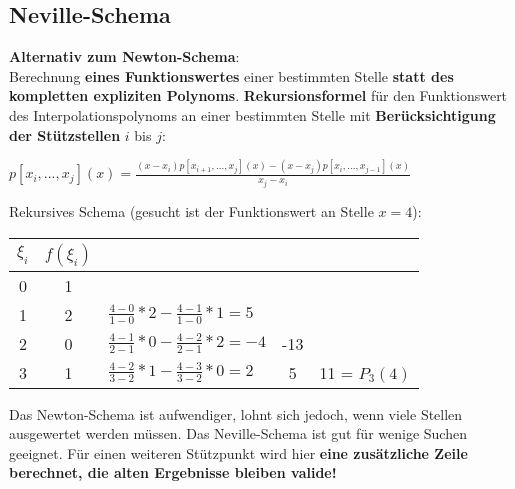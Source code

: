 \subsection{Neville-Schema}%
\label{pi:sub:neville-schema}
\textbf{Alternativ zum Newton-Schema}:\\Berechnung \textbf{eines Funktionswertes} einer bestimmten Stelle \textbf{statt des kompletten expliziten Polynoms}. \textbf{Rekursionsformel} für den Funktionswert des Interpolationspolynoms an einer bestimmten Stelle mit \textbf{Berücksichtigung der Stützstellen} $i$ bis $j$:
\begin{center}
	$p[x_i,...,x_j](x) = \frac{(x - x_i) p[x_{i + 1},...,x_j](x) - (x - x_j)p[x_i,...,x_{j-1}](x)}{x_j - x_i}$
\end{center}
Rekursives Schema (gesucht ist der Funktionswert an Stelle $x = 4$):\\
\begin{center}
	\begin{tabular}{c | c l c c}
		$\xi_i$ & $f(\xi_i)$ & & &\\
		\hline
		0 & 1 & &\\
		1 & 2 & $\frac{4 - 0}{1 - 0} * 2 - \frac{4 - 1}{1 - 0} * 1 = 5$ & &\\
		2 & 0 & $\frac{4 - 1}{2 - 1} * 0 - \frac{4 - 2}{2 - 1} * 2 = -4$ & -13 &\\
		3 & 1 & $\frac{4 - 2}{3 - 2} * 1 - \frac{4 - 3}{3 - 2} * 0 = 2$ & 5 & 11 = $P_3(4)$
	\end{tabular}
\end{center}
Das Newton-Schema ist aufwendiger, lohnt sich jedoch, wenn viele Stellen ausgewertet werden müssen. Das Neville-Schema ist gut für wenige Suchen geeignet. Für einen weiteren Stützpunkt wird hier \textbf{eine zusätzliche Zeile berechnet, die alten Ergebnisse bleiben valide!}